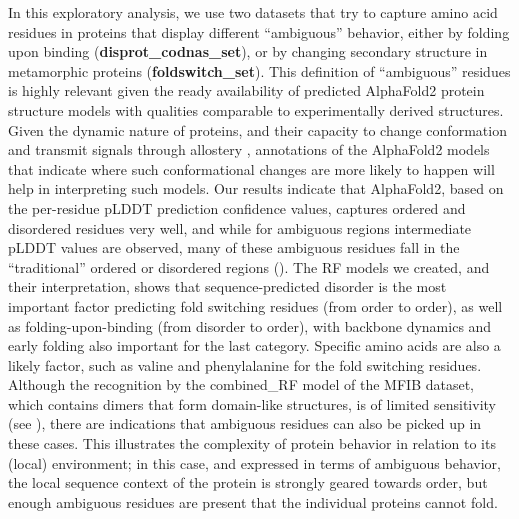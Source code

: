 In this exploratory analysis, we use two datasets that try to capture amino acid residues in proteins that display different ``ambiguous'' behavior, either by folding upon binding (\textbf{disprot_codnas_set}), or by changing secondary structure in metamorphic proteins (\textbf{foldswitch_set}). This definition of ``ambiguous'' residues is highly relevant given the ready availability of predicted AlphaFold2 protein structure models with qualities comparable to experimentally derived structures. Given the dynamic nature of proteins, and their capacity to change conformation and transmit signals through allostery \cite{tompa_multisteric_2014, tompa_principle_2016}, annotations of the AlphaFold2 models that indicate where such conformational changes are more likely to happen will help in interpreting such models. Our results indicate that AlphaFold2, based on the per-residue pLDDT prediction confidence values, captures ordered and disordered residues very well, and while for ambiguous regions intermediate pLDDT values are observed, many of these ambiguous residues fall in the ``traditional'' ordered or disordered regions (). The RF models we created, and their interpretation, shows that sequence-predicted disorder is the most important factor predicting fold switching residues (from order to order), as well as folding-upon-binding (from disorder to order), with backbone dynamics and early folding also important for the last category. Specific amino acids are also a likely factor, such as valine and phenylalanine for the fold switching residues. Although the recognition by the combined_RF model of the MFIB dataset, which contains dimers that form domain-like structures, is of limited sensitivity (see ), there are indications that ambiguous residues can also be picked up in these cases. This illustrates the complexity of protein behavior in relation to its (local) environment; in this case, and expressed in terms of ambiguous behavior, the local sequence context of the protein is strongly geared towards order, but enough ambiguous residues are present that the individual proteins cannot fold.

